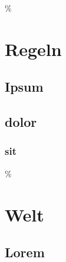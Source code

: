\documentclass[twoside,a5paper]{memoir}
\begin{document}
\maketitle
\newpage

\tableofcontents

\% \pagebreak

\part{Regeln}
\label{sec-1}

\chapter{Ipsum}
\label{sec-1-1}

\chapter{dolor}
\label{sec-1-2}

\section{sit}
\label{sec-1-2-1}

\lipsum*[1]

\marginpar{\lipsum*[2]}
\lipsum*[3]

\marginpar{\lipsum*[4]}
\lipsum*[5]

\% \marginpar{\lipsum*[6]}
\lipsum*[8]

\part{Welt}
\label{sec-2}

\chapter{Lorem}
\label{sec-2-1}

\lipsum*[7]


\pagebreak

\layout
\end{document}
